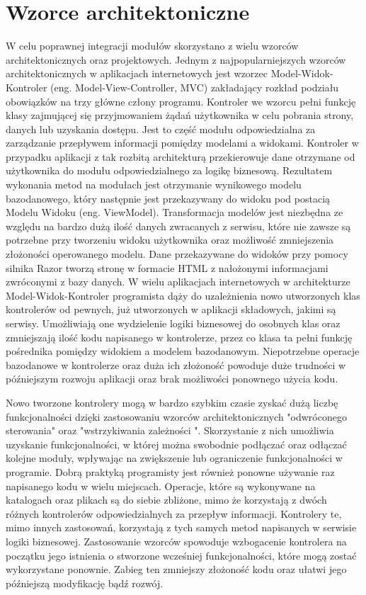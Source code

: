 \section{Wzorce architektoniczne}
{W celu poprawnej integracji modułów skorzystano z wielu wzorców architektonicznych oraz projektowych. Jednym z najpopularniejszych wzorców architektonicznych w aplikacjach internetowych jest wzorzec Model-Widok-Kontroler (eng. Model-View-Controller, MVC) zakładający rozkład podziału obowiązków na trzy główne człony programu. Kontroler we wzorcu pełni funkcję klasy zajmującej się przyjmowaniem żądań użytkownika w celu pobrania strony, danych lub uzyskania dostępu. Jest to część modułu odpowiedzialna za zarządzanie przepływem informacji pomiędzy modelami a widokami. Kontroler w przypadku aplikacji z tak rozbitą architekturą przekierowuje dane otrzymane od użytkownika do modułu odpowiedzialnego za logikę biznesową. Rezultatem wykonania metod na modułach jest otrzymanie wynikowego modelu bazodanowego, który następnie jest przekazywany do widoku pod postacią Modelu Widoku (eng. ViewModel). Transformacja modelów jest niezbędna ze względu na bardzo dużą ilość danych zwracanych z serwisu, które nie zawsze są potrzebne przy tworzeniu widoku użytkownika oraz możliwość zmniejszenia złożoności operowanego modelu. Dane przekazywane do widoków przy pomocy silnika Razor tworzą stronę \mbox{w} formacie HTML z nałożonymi informacjami zwróconymi z bazy danych.
\newpage
W wielu aplikacjach internetowych w architekturze Model-Widok-Kontroler programista dąży do uzależnienia nowo utworzonych klas kontrolerów od pewnych, już utworzonych w aplikacji składowych, jakimi są serwisy. Umożliwiają one wydzielenie logiki biznesowej do osobnych klas oraz zmniejszają ilość kodu napisanego w kontrolerze, przez co klasa ta pełni funkcję pośrednika pomiędzy widokiem a modelem bazodanowym. Niepotrzebne operacje bazodanowe w kontrolerze oraz duża ich złożoność powoduje duże trudności w późniejszym rozwoju aplikacji oraz brak możliwości ponownego użycia kodu. 

Nowo tworzone kontrolery mogą w bardzo szybkim czasie zyskać dużą liczbę funkcjonalności dzięki zastosowaniu wzorców architektonicznych "odwróconego sterowania" oraz "wstrzykiwania zależności ". Skorzystanie z nich umożliwia uzyskanie funkcjonalności, w której można swobodnie podłączać oraz odłączać kolejne moduły, wpływając na zwiększenie lub ograniczenie funkcjonalności w programie. Dobrą praktyką programisty jest również ponowne używanie raz napisanego kodu w wielu miejscach. Operacje, które są wykonywane na katalogach oraz plikach są do siebie zbliżone, mimo że korzystają z dwóch różnych kontrolerów odpowiedzialnych za przepływ informacji. Kontrolery te, mimo innych zastosowań, korzystają z tych samych metod napisanych w serwisie logiki biznesowej. Zastosowanie wzorców spowoduje wzbogacenie kontrolera na początku jego istnienia o stworzone wcześniej funkcjonalności, które mogą zostać wykorzystane ponownie. Zabieg ten zmniejszy złożoność kodu oraz ułatwi jego późniejszą modyfikację bądź rozwój. 

}
